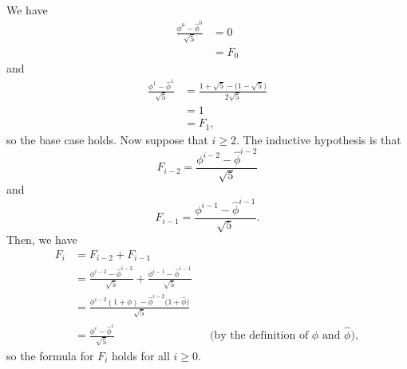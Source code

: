 We have
\begin{align*}
    \frac{\phi^0-\widehat\phi^0}{\sqrt{5}} &= 0 \\
    &= F_0
\end{align*}
and
\begin{align*}
    \frac{\phi^1-\widehat\phi^1}{\sqrt{5}} &= \frac{1+\sqrt{5}-\bigl(1-\sqrt{5}\bigr)}{2\sqrt{5}} \\
    &= 1 \\
    &= F_1,
\end{align*}
so the base case holds.
Now suppose that $i\ge2$.
The inductive hypothesis is that
\[
    F_{i-2} = \frac{\phi^{i-2}-\widehat\phi^{i-2}}{\sqrt{5}}
\]
and
\[
    F_{i-1} = \frac{\phi^{i-1}-\widehat\phi^{i-1}}{\sqrt{5}}.
\]
Then, we have
\begin{align*}
    F_i &= F_{i-2}+F_{i-1} \\[1mm]
    &= \frac{\phi^{i-2}-\widehat\phi^{i-2}}{\sqrt{5}}+\frac{\phi^{i-1}-\widehat\phi^{i-1}}{\sqrt{5}} \\[1mm]
    &= \frac{\phi^{i-2}(1+\phi)-\widehat\phi^{i-2}\bigl(1+\widehat\phi\bigr)}{\sqrt{5}} \\
    &= \frac{\phi^i-\widehat\phi^i}{\sqrt{5}} && \text{(by the definition of $\phi$ and $\widehat\phi$)},
\end{align*}
so the formula for $F_i$ holds for all $i\ge0$.
